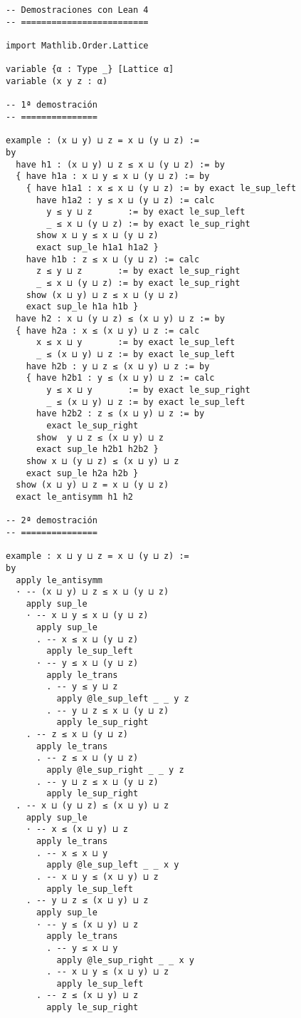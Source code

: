 \begin{verbatim}
-- Demostraciones con Lean 4
-- =========================

import Mathlib.Order.Lattice

variable {α : Type _} [Lattice α]
variable (x y z : α)

-- 1ª demostración
-- ===============

example : (x ⊔ y) ⊔ z = x ⊔ (y ⊔ z) :=
by
  have h1 : (x ⊔ y) ⊔ z ≤ x ⊔ (y ⊔ z) := by
  { have h1a : x ⊔ y ≤ x ⊔ (y ⊔ z) := by
    { have h1a1 : x ≤ x ⊔ (y ⊔ z) := by exact le_sup_left
      have h1a2 : y ≤ x ⊔ (y ⊔ z) := calc
        y ≤ y ⊔ z       := by exact le_sup_left
        _ ≤ x ⊔ (y ⊔ z) := by exact le_sup_right
      show x ⊔ y ≤ x ⊔ (y ⊔ z)
      exact sup_le h1a1 h1a2 }
    have h1b : z ≤ x ⊔ (y ⊔ z) := calc
      z ≤ y ⊔ z       := by exact le_sup_right
      _ ≤ x ⊔ (y ⊔ z) := by exact le_sup_right
    show (x ⊔ y) ⊔ z ≤ x ⊔ (y ⊔ z)
    exact sup_le h1a h1b }
  have h2 : x ⊔ (y ⊔ z) ≤ (x ⊔ y) ⊔ z := by
  { have h2a : x ≤ (x ⊔ y) ⊔ z := calc
      x ≤ x ⊔ y       := by exact le_sup_left
      _ ≤ (x ⊔ y) ⊔ z := by exact le_sup_left
    have h2b : y ⊔ z ≤ (x ⊔ y) ⊔ z := by
    { have h2b1 : y ≤ (x ⊔ y) ⊔ z := calc
        y ≤ x ⊔ y       := by exact le_sup_right
        _ ≤ (x ⊔ y) ⊔ z := by exact le_sup_left
      have h2b2 : z ≤ (x ⊔ y) ⊔ z := by
        exact le_sup_right
      show  y ⊔ z ≤ (x ⊔ y) ⊔ z
      exact sup_le h2b1 h2b2 }
    show x ⊔ (y ⊔ z) ≤ (x ⊔ y) ⊔ z
    exact sup_le h2a h2b }
  show (x ⊔ y) ⊔ z = x ⊔ (y ⊔ z)
  exact le_antisymm h1 h2

-- 2ª demostración
-- ===============

example : x ⊔ y ⊔ z = x ⊔ (y ⊔ z) :=
by
  apply le_antisymm
  · -- (x ⊔ y) ⊔ z ≤ x ⊔ (y ⊔ z)
    apply sup_le
    · -- x ⊔ y ≤ x ⊔ (y ⊔ z)
      apply sup_le
      . -- x ≤ x ⊔ (y ⊔ z)
        apply le_sup_left
      · -- y ≤ x ⊔ (y ⊔ z)
        apply le_trans
        . -- y ≤ y ⊔ z
          apply @le_sup_left _ _ y z
        . -- y ⊔ z ≤ x ⊔ (y ⊔ z)
          apply le_sup_right
    . -- z ≤ x ⊔ (y ⊔ z)
      apply le_trans
      . -- z ≤ x ⊔ (y ⊔ z)
        apply @le_sup_right _ _ y z
      . -- y ⊔ z ≤ x ⊔ (y ⊔ z)
        apply le_sup_right
  . -- x ⊔ (y ⊔ z) ≤ (x ⊔ y) ⊔ z
    apply sup_le
    · -- x ≤ (x ⊔ y) ⊔ z
      apply le_trans
      . -- x ≤ x ⊔ y
        apply @le_sup_left _ _ x y
      . -- x ⊔ y ≤ (x ⊔ y) ⊔ z
        apply le_sup_left
    . -- y ⊔ z ≤ (x ⊔ y) ⊔ z
      apply sup_le
      · -- y ≤ (x ⊔ y) ⊔ z
        apply le_trans
        . -- y ≤ x ⊔ y
          apply @le_sup_right _ _ x y
        . -- x ⊔ y ≤ (x ⊔ y) ⊔ z
          apply le_sup_left
      . -- z ≤ (x ⊔ y) ⊔ z
        apply le_sup_right


\end{verbatim}
